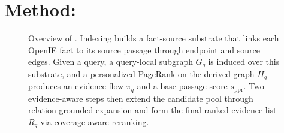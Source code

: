 %
%
%

\section{Method: \methodname{}}
\label{sec:method}

\begin{figure}[t]
\centering
{}
\caption{Overview of \methodname{}. Indexing builds a fact-source
substrate that links each OpenIE fact to its source passage through
endpoint and source edges. Given a query, a query-local subgraph
$G_q$ is induced over this substrate, and a personalized PageRank on
the derived graph $H_q$ produces an evidence flow $\pi_q$ and a base
passage score $s_{\mathrm{ppr}}$. Two evidence-aware steps then
extend the candidate pool through relation-grounded expansion and
form the final ranked evidence list $R_q$ via coverage-aware
reranking.}
\label{fig:overview}
\end{figure}

